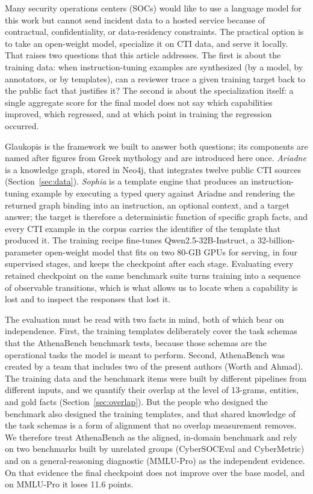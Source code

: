 \documentclass[preprint,12pt,authoryear]{elsarticle}
\begin{document}
Many security operations centers (SOCs) would like to use a language model for this work but cannot send incident data to a hosted service because of contractual, confidentiality, or data-residency constraints. The practical option is to take an open-weight model, specialize it on CTI data, and serve it locally. That raises two questions that this article addresses. The first is about the training data: when instruction-tuning examples are synthesized (by a model, by annotators, or by templates), can a reviewer trace a given training target back to the public fact that justifies it? The second is about the specialization itself: a single aggregate score for the final model does not say which capabilities improved, which regressed, and at which point in training the regression occurred.

Glaukopis is the framework we built to answer both questions; its components are named after figures from Greek mythology and are introduced here once. \emph{Ariadne} is a knowledge graph, stored in Neo4j, that integrates twelve public CTI sources (Section~\ref{sec:data}). \emph{Sophia} is a template engine that produces an instruction-tuning example by executing a typed query against Ariadne and rendering the returned graph binding into an instruction, an optional context, and a target answer; the target is therefore a deterministic function of specific graph facts, and every CTI example in the corpus carries the identifier of the template that produced it. The training recipe fine-tunes Qwen2.5-32B-Instruct, a 32-billion-parameter open-weight model that fits on two 80-GB GPUs for serving, in four supervised stages, and keeps the checkpoint after each stage. Evaluating every retained checkpoint on the same benchmark suite turns training into a sequence of observable transitions, which is what allows us to locate when a capability is lost and to inspect the responses that lost it.

The evaluation must be read with two facts in mind, both of which bear on independence. First, the training templates deliberately cover the task schemas that the AthenaBench benchmark tests, because those schemas are the operational tasks the model is meant to perform. Second, AthenaBench was created by a team that includes two of the present authors (Worth and Ahmad). The training data and the benchmark items were built by different pipelines from different inputs, and we quantify their overlap at the level of 13-grams, entities, and gold facts (Section~\ref{sec:overlap}). But the people who designed the benchmark also designed the training templates, and that shared knowledge of the task schemas is a form of alignment that no overlap measurement removes. We therefore treat AthenaBench as the aligned, in-domain benchmark and rely on two benchmarks built by unrelated groups (CyberSOCEval and CyberMetric) and on a general-reasoning diagnostic (MMLU-Pro) as the independent evidence. On that evidence the final checkpoint does not improve over the base model, and on MMLU-Pro it loses 11.6 points.
\end{document}
